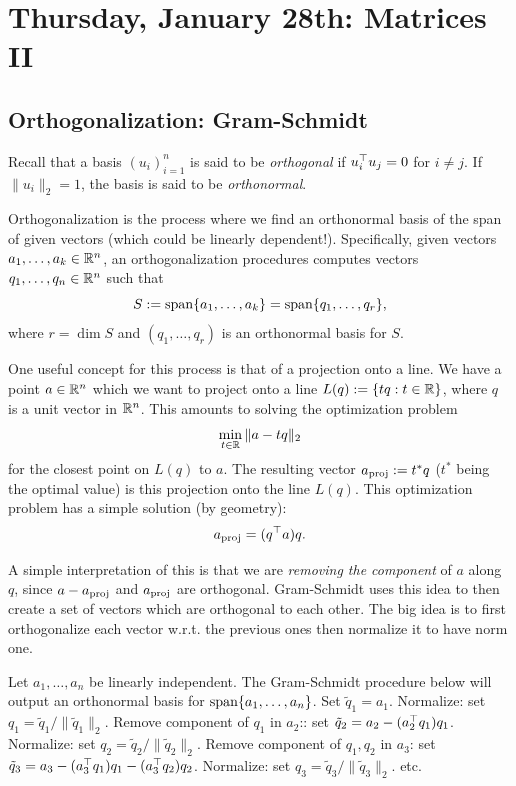 \documentclass[11 pt]{scrartcl}
\begin{document}
\newpage
\section{Thursday, January 28th: Matrices II}

\subsection{Orthogonalization: Gram-Schmidt}
Recall that a basis $(u_i)_{i=1}^n$ is said to be \emph{orthogonal} if $u_i^\top u_j = 0$ for $i\not= j$. 
If $\|u_i\|_2 = 1$, the basis is said to be \emph{orthonormal}.


Orthogonalization is the process where we find an orthonormal basis of the span of given vectors (which could be linearly dependent!). 
Specifically, given vectors $a_1, \dots, a_k\in \mathbb R^n$, an orthogonalization procedures computes vectors $q_1, \dots, q_n\in \mathbb R^n$ such that 
\[ S:= \text{span} \{a_1, \dots, a_k\} = \text{span}\{q_1,\dots,q_r\},\] 
where $r = \dim S$ and $(q_1, \dots, q_r)$ is an orthonormal basis for $S$. 

One useful concept for this process is that of a projection onto a line. 
We have a point $a\in \mathbb R^n$ which we want to project onto a line $L(q) := \{tq : t\in \mathbb R\}$, where $q$ is a unit vector in $\mathbb R^n$. 
This amounts to solving the optimization problem 
\[ \min_{t\in \mathbb R} \|a-tq\|_2\] 
for the closest point on $L(q)$ to $a$. 
The resulting vector $a_{\text{proj}} := t^* q$ ($t^*$ being the optimal value) is this projection onto the line $L(q)$. 
This optimization problem has a simple solution (by geometry):
\[ a_{\text{proj}} = (q^\top a) q.\] 

A simple interpretation of this is that we are \emph{removing the component} of $a$ along $q$, since $a-a_{\text{proj}}$ and $a_{\text{proj}}$ are orthogonal. 
Gram-Schmidt uses this idea to then create a set of vectors which are orthogonal to each other. 
The big idea is to first orthogonalize each vector w.r.t. the previous ones then normalize it to have norm one. 

\begin{theorem}
    Let $a_1, \dots, a_n$ be linearly independent. 
    The Gram-Schmidt procedure below will output an orthonormal basis for $\text{span}\{a_1, \dots, a_n\}$. 
    \itemnum
        \ii Set $\tilde{q}_1 = a_1$. 
        \ii Normalize: set $q_1 = \tilde{q}_1/\|\tilde{q}_1\|_2.$
        \ii Remove component of $q_1$ in $a_2$:: set $\tilde{q}_2 = a_2 - (a_2^\top q_1) q_1$. 
        \ii Normalize: set $q_2 = \tilde{q}_2/\|\tilde{q}_2\|_2$. 
        \ii Remove component of $q_1, q_2$ in $a_3$: set $\tilde{q}_3 = a_3 - (a_3^\top q_1)q_1 - (a_3^\top q_2)q_2$. 
        \ii Normalize: set $q_3 = \tilde{q}_3/\|\tilde{q}_3\|_2$. 
        \ii etc.
    \itemend
\end{theorem}
\end{document}
